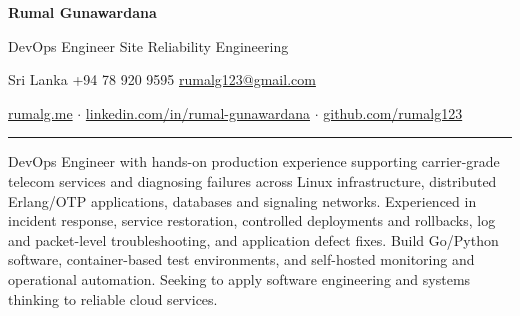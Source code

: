 
\begin{center}
{\Huge\bfseries Rumal Gunawardana}
\vspace{0.10cm}

{\large\color{primary} DevOps Engineer \textbar{} Site Reliability Engineering}
\vspace{0.16cm}

Sri Lanka \textbar{} +94 78 920 9595 \textbar{}
\href{mailto:rumalg123@gmail.com}{rumalg123@gmail.com}
\vspace{0.07cm}

\href{https://rumalg.me}{rumalg.me} \quad$\cdot$\quad
\href{https://www.linkedin.com/in/rumal-gunawardana}{linkedin.com/in/rumal-gunawardana}
\quad$\cdot$\quad
\href{https://github.com/rumalg123}{github.com/rumalg123}
\end{center}
\vspace{0.05cm}\hrule\vspace{0.08cm}

DevOps Engineer with hands-on production experience supporting carrier-grade telecom services and diagnosing failures across Linux infrastructure, distributed Erlang/OTP applications, databases and signaling networks. Experienced in incident response, service restoration, controlled deployments and rollbacks, log and packet-level troubleshooting, and application defect fixes. Build Go/Python software, container-based test environments, and self-hosted monitoring and operational automation. Seeking to apply software engineering and systems thinking to reliable cloud services.


